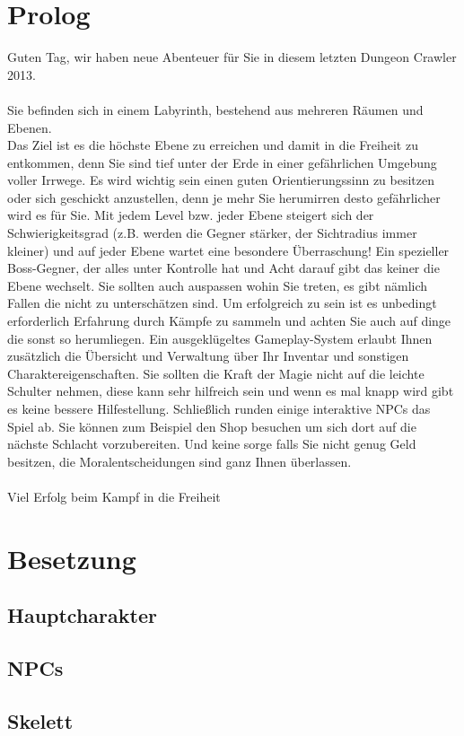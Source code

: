 \documentclass[12pt, a4paper]{scrreprt}
\begin{document}
\section{Prolog}
Guten Tag, wir haben neue Abenteuer für Sie in diesem letzten Dungeon Crawler 2013.\\\\
Sie befinden sich in einem Labyrinth, bestehend aus mehreren Räumen und Ebenen.\\
Das Ziel ist es die höchste Ebene zu erreichen und damit in die Freiheit zu entkommen, denn Sie sind tief unter der Erde in einer gefährlichen Umgebung voller Irrwege. Es wird wichtig sein einen guten Orientierungssinn zu besitzen oder sich geschickt anzustellen, denn je mehr Sie herumirren desto gefährlicher wird es für Sie. Mit jedem Level bzw. jeder Ebene steigert sich der Schwierigkeitsgrad (z.B. werden die Gegner stärker, der Sichtradius immer kleiner) und auf jeder Ebene wartet eine besondere Überraschung! Ein spezieller Boss-Gegner, der alles unter Kontrolle hat und Acht darauf gibt das keiner die Ebene wechselt. Sie sollten auch auspassen wohin Sie treten, es gibt nämlich Fallen die nicht zu unterschätzen sind. Um erfolgreich zu sein ist es unbedingt erforderlich Erfahrung durch Kämpfe zu sammeln und achten Sie auch auf dinge die sonst so herumliegen. Ein ausgeklügeltes Gameplay-System erlaubt Ihnen zusätzlich die Übersicht und Verwaltung über Ihr Inventar und sonstigen Charaktereigenschaften. Sie sollten die Kraft der Magie nicht auf die leichte Schulter nehmen, diese kann sehr hilfreich sein und wenn es mal knapp wird gibt es keine bessere Hilfestellung. Schließlich runden einige interaktive NPCs das Spiel ab. Sie können zum Beispiel den Shop besuchen um sich dort auf die nächste Schlacht vorzubereiten. Und keine sorge falls Sie nicht genug Geld besitzen, die Moralentscheidungen sind ganz Ihnen überlassen.\\\\
Viel Erfolg beim Kampf in die Freiheit
\section{Besetzung}
\subsection*{Hauptcharakter}
\subsection*{NPCs}
\subsection*{Skelett}
\end{document}
